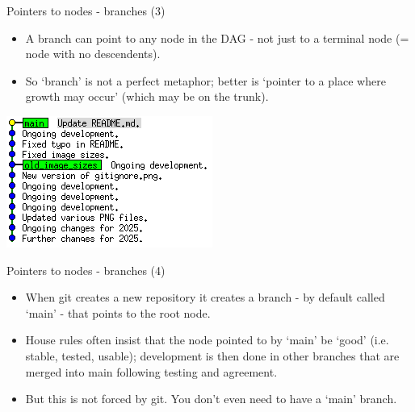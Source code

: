 \documentclass[usenames,dvipsnames]{beamer}
\begin{document}
\begin{frame}{Pointers to nodes - branches (3)}
  \begin{block}{}
    \begin{itemize}
      \item{A branch can point to any node in the DAG - not just to a terminal node (= node with no descendents).}
      \item{So `branch' is not a perfect metaphor; better is `pointer to a place where growth may occur' (which may be on the trunk).}
    \end{itemize}
    \begin{center}
      \includegraphics[scale=0.8]{Branch_3.png}
    \end{center}
  \end{block}
\end{frame}

\begin{frame}{Pointers to nodes - branches (4)}
  \begin{block}{}
    \begin{itemize}
      \item{When git creates a new repository it creates a branch - by default called `main' - that points to the root node.}
      \item{House rules often insist that the node pointed to by `main' be `good' (i.e. stable, tested, usable); development is then done in other branches that are merged into main following testing and agreement.}
      \item{But this is not forced by git. You don't even need to have a `main' branch.}
    \end{itemize}
  \end{block}
\end{frame}
\end{document}
